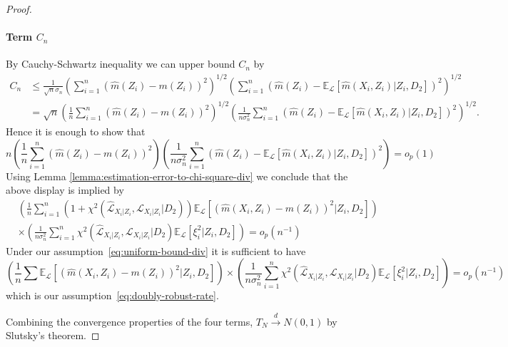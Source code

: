 \documentclass[12pt]{article}
\theoremstyle{definition}
\theoremstyle{remark}
\newcommand{\E}{\mathbb E}								%
\newcommand{\convd}{\overset d \rightarrow}             %
\newcommand{\srx}{X}									%
\newcommand{\srz}{Z}									%
\newcommand{\law}{\mathcal L}							%
\newcommand{\lawhat}{\widehat{\mathcal L}}				%
\begin{document}
\begin{proof}
	\paragraph{Term $C_n$} By Cauchy-Schwartz inequality we can upper bound $C_n$ by
	\begin{align*}
		C_n &\leq \frac{1}{\sqrt n \sigma_n} \left(\sum_{i=1}^n (\widehat m(\srz_i) - m(\srz_i))^2\right)^{1/2} \left(\sum_{i=1}^n(\widehat m(\srz_i) - \E_{\law} [\widehat m(\srx_i,\srz_i) |\srz_i,D_2])^2\right)^{1/2}\\
		&= \sqrt n \left(\frac{1}{n}\sum_{i=1}^n (\widehat m(\srz_i) - m(\srz_i))^2\right)^{1/2} \left(\frac{1}{ n \sigma^2_n}\sum_{i=1}^n(\widehat m(\srz_i) - \E_{\law} [\widehat m(\srx_i,\srz_i) |\srz_i,D_2])^2\right)^{1/2}.
	\end{align*}
	Hence it is enough to show that
	\begin{equation}\label{eq:upper-bd-C_n}
		  n \left(\frac{1}{n}\sum_{i=1}^n (\widehat m(\srz_i) - m(\srz_i))^2\right) \left(\frac{1}{ n \sigma^2_n}\sum_{i=1}^n(\widehat m(\srz_i) - \E_{\law} [\widehat m(\srx_i,\srz_i) |\srz_i,D_2])^2\right) = o_p(1)
	\end{equation}
	Using Lemma \ref{lemma:estimation-error-to-chi-square-div} we conclude that the above display is implied by
	\begin{align*}
		&\left(\frac{1}{n} \sum_{i=1}^n \left(1 +  \chi^2\left(\lawhat_{\srx_i|\srz_i}, \law_{\srx_i|\srz_i} | D_2\right)\right)  \E_\law[ (\widehat m(\srx_i,\srz_i) - m(\srz_i))^2|\srz_i,D_2]\right)	\\
		&\times\left(\frac{1}{n \sigma_n^2} \sum_{i=1}^n \chi^2\left(\lawhat_{\srx_i|\srz_i}, \law_{\srx_i|\srz_i} | D_2\right) \E_\law [\xi_i^2 |\srz_i,D_2]\right) = o_p(n^{-1})
	\end{align*}
	Under our assumption~\eqref{eq:uniform-bound-div} it is sufficient to have 
	$$
	\left(\frac{1}{n} \sum   \E_\law[ (\widehat m(\srx_i,\srz_i) - m(\srz_i))^2|\srz_i,D_2]\right)
	\times\left(\frac{1}{n \sigma_n^2} \sum_{i=1}^n \chi^2\left(\lawhat_{\srx_i|\srz_i}, \law_{\srx_i|\srz_i} | D_2\right) \E_\law [\xi_i^2 |\srz_i,D_2]\right) = o_p(n^{-1})
	$$
	which is our assumption~\eqref{eq:doubly-robust-rate}.
	
	Combining the convergence properties of the four terms,  $T_N \convd N(0,1)$ by Slutsky's theorem. 
\end{proof}
	
\end{document}
